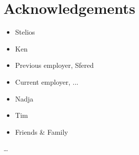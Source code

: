 
\chapter*{Acknowledgements}

\begin{itemize}
    \item Stelios
    \item Ken
    \item Previous employer, Sfered
    \item Current employer, ...
    \item Nadja
    \item Tim
    \item Friends \& Family
\end{itemize}

\ldots



 